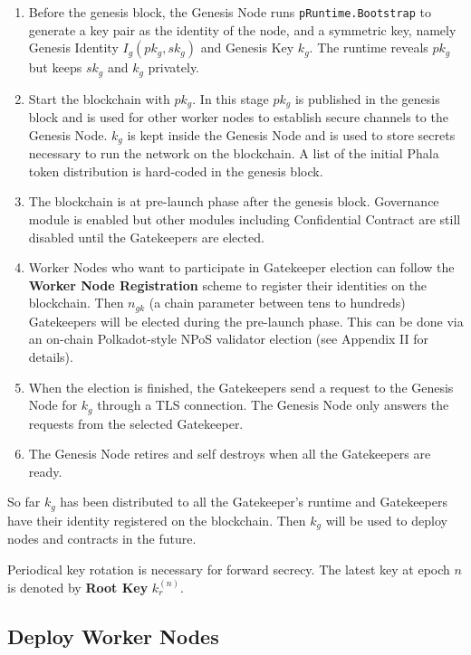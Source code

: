 \begin{enumerate}
    \item Before the genesis block, the Genesis Node runs \texttt{pRuntime.Bootstrap} to generate a key pair as the identity of the node, and a symmetric key, namely Genesis Identity $I_g(pk_g, sk_g)$ and Genesis Key $k_g$. The runtime reveals $pk_g$ but keeps $sk_g$ and $k_g$ privately.

    \item Start the blockchain with $pk_g$. In this stage $pk_g$ is published in the genesis block and is used for other worker nodes to establish secure channels to the Genesis Node. $k_g$ is kept inside the Genesis Node and is used to store secrets necessary to run the network on the blockchain. A list of the initial Phala token distribution is hard-coded in the genesis block.

    \item The blockchain is at pre-launch phase after the genesis block. Governance module is enabled but other modules including Confidential Contract are still disabled until the Gatekeepers are elected.

    \item Worker Nodes who want to participate in Gatekeeper election can follow the \textbf{Worker Node Registration} scheme to register their identities on the blockchain. Then $n_{gk}$ (a chain parameter between tens to hundreds) Gatekeepers will be elected during the pre-launch phase. This can be done via an on-chain Polkadot-style NPoS validator election (see Appendix II for details).

    \item When the election is finished, the Gatekeepers send a request to the Genesis Node for $k_g$ through a TLS connection. The Genesis Node only answers the requests from the selected Gatekeeper.

    \item The Genesis Node retires and self destroys when all the Gatekeepers are ready.
\end{enumerate}

So far $k_g$ has been distributed to all the Gatekeeper's runtime and Gatekeepers have their identity registered on the blockchain. Then $k_g$ will be used to deploy nodes and contracts in the future.

Periodical key rotation is necessary for forward secrecy. The latest key at epoch $n$ is denoted by \textbf{Root Key} $k_r^{(n)}$.

\subsection{Deploy Worker Nodes}

